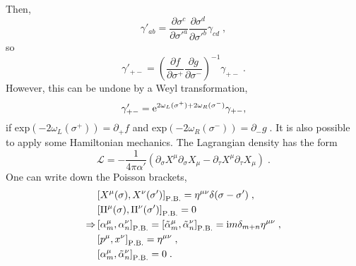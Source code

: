 \documentclass[11pt]{article} %
\begin{document}
Then,
\begin{equation}
	\gamma'_{ab} = \dfrac{\partial\sigma^c}{\partial\sigma'^a}\dfrac{\partial\sigma^d}{\partial\sigma'^b}\gamma_{cd}\;,
\end{equation}
so
\begin{equation}
	\gamma'_{+-}=\left( \dfrac{\partial f}{\partial\sigma^+}\dfrac{\partial g}{\partial\sigma^-} \right)^{-1}\gamma_{+-}\;.                                                                                                                                                                                                                                                                                                                                                                                                                                                                                                                                                                                                                                                                                                                                                                                                                                                                                                                                                                                                                                                                                                                                                    
\end{equation}
However, this can be undone by a Weyl transformation,
\begin{equation}
	\gamma'_{+-} = \mathrm{e}^{2\omega_L(\sigma^+) + 2\omega_R(\sigma^-)}\gamma_{+-},
\end{equation}
if exp$(-2\omega_L(\sigma^+)) = \partial_+f$ and exp$(-2\omega_R(\sigma^-)) = \partial_-g\;$.\newline
It is also possible to apply some Hamiltonian mechanics. The Lagrangian density has the form
\begin{equation}
	\mathcal{L} = -\dfrac{1}{4\pi\alpha'} \left( \partial_{\sigma}X^{\mu}\partial_{\sigma}X_{\mu} -  \partial_{\tau}X^{\mu}\partial_{\tau}X_{\mu}\right)\;.
\end{equation}
One can write down the Poisson brackets,
\begin{align}
	&\left[  X^{\mu}(\sigma),  X^{\nu}(\sigma')\right]_{\mathrm{P.B.}} = \eta^{\mu\nu} \delta(\sigma - \sigma')\;,\\
	&\left[  \Pi^{\mu}(\sigma),  \Pi^{\nu}(\sigma')\right]_{\mathrm{P.B.}} = 0\\
	\Rightarrow& \left[ \alpha^{\mu}_m, \alpha^{\nu}_n\right]_{\mathrm{P.B.}} = \left[ \tilde{\alpha}^{\mu}_m, \tilde{\alpha}^{\nu}_n\right]_{\mathrm{P.B.}} = \mathrm{i} m\delta_{m+n}\eta^{\mu\nu}\;,\\
	&\left[ p^{\mu}, x^{\nu}\right]_{\mathrm{P.B.}} = \eta^{\mu\nu}\;,\\
	& \left[ \alpha^{\mu}_m, \tilde{\alpha}^{\nu}_n\right]_{\mathrm{P.B.}} =0\;.
\end{align}
\end{document}
